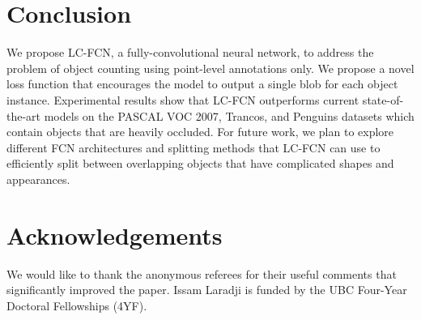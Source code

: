 \documentclass[runningheads]{llncs}
\begin{document}
\section{Conclusion}
\label{sec:conclusion}
We propose LC-FCN, a fully-convolutional neural network, to address the problem of object counting using point-level annotations only. We propose a novel loss function that encourages the model to output a single blob for each object instance. Experimental results show
that LC-FCN outperforms current state-of-the-art models on the PASCAL VOC
2007, Trancos, and Penguins datasets which contain objects that are heavily occluded. For future work, we plan to explore different FCN architectures and splitting methods that LC-FCN can use to efficiently split between overlapping
objects that have complicated shapes and appearances. 


\section{Acknowledgements}
We would like to thank the anonymous referees for their useful comments that significantly improved the
paper. Issam Laradji is funded by the UBC Four-Year Doctoral Fellowships (4YF).
\clearpage



\end{document}
